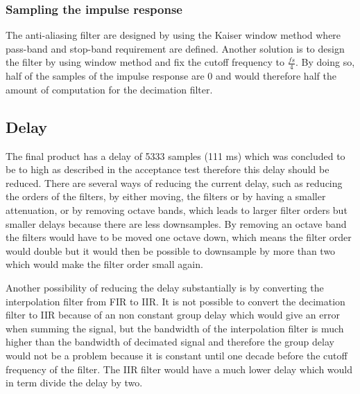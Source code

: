 \subsubsection*{Sampling the impulse response}
The anti-aliasing filter are designed by using the Kaiser window method where pass-band and stop-band requirement are defined. Another solution is to design the filter by using window method and fix the cutoff frequency to $\frac{fs}{4}$. By doing so, half of the samples of the impulse response are 0 and would therefore half the amount of computation for the decimation filter.






\subsection*{Delay}
The final product has a delay of 5333 samples (111 ms) which was concluded to be to high as described in the acceptance test therefore this delay should be reduced. There are several ways of reducing the current delay, such as reducing the orders of the filters, by either moving, the filters or by having a smaller attenuation, or by removing octave bands, which leads to larger filter orders but smaller delays because there are less downsamples. By removing an octave band the filters would have to be moved one octave down, which means the filter order would double but it would then be possible to downsample by more than two which would make the filter order small again.

Another possibility of reducing the delay substantially is by converting the interpolation filter from FIR to IIR. It is not possible to convert the decimation filter to IIR because of an non constant group delay which would give an error when summing the signal, but the bandwidth of the interpolation filter is much higher than the bandwidth of decimated signal and therefore the group delay would not be a problem because it is constant until one decade before the cutoff frequency of the filter. The IIR filter would have a much lower delay which would in term divide the delay by two.   

